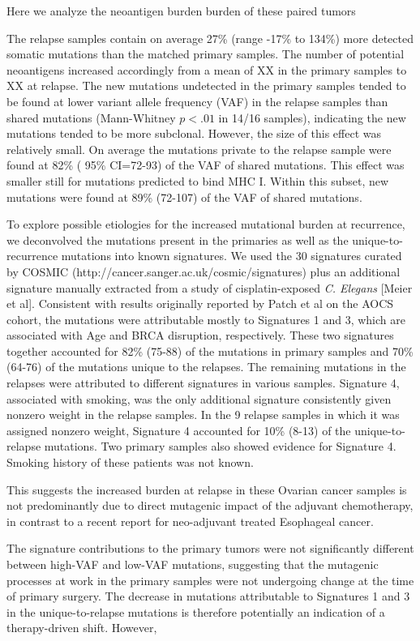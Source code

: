 Here we analyze the neoantigen burden burden of these paired tumors 

The relapse samples contain on average 27\% (range -17\% to 134\%) more detected somatic mutations than the matched primary samples. The number of potential neoantigens increased accordingly from a mean of XX in the primary samples to XX at relapse. The new mutations undetected in the primary samples tended to be found at lower variant allele frequency (VAF) in the relapse samples than shared mutations (Mann-Whitney $p \lt .01$ in 14/16 samples), indicating the new mutations tended to be more subclonal. However, the size of this effect was relatively small. On average the mutations private to the relapse sample were found at 82\% ( 95\% CI=72-93) of the VAF of shared mutations. This effect was smaller still for mutations predicted to bind MHC I. Within this subset, new mutations were found at 89\% (72-107) of the VAF of shared mutations.

To explore possible etiologies for the increased mutational burden at recurrence, we deconvolved the mutations present in the primaries as well as the unique-to-recurrence mutations into known signatures. We used the 30 signatures curated by COSMIC (http://cancer.sanger.ac.uk/cosmic/signatures) plus an additional signature manually extracted from a study of cisplatin-exposed \textit{C. Elegans} [Meier et al]. Consistent with results originally reported by Patch et al on the AOCS cohort, the mutations were attributable mostly to Signatures 1 and 3, which are associated with Age and BRCA disruption, respectively. These two signatures together accounted for 82\% (75-88) of the mutations in primary samples and 70\% (64-76) of the mutations unique to the relapses. The remaining mutations in the relapses were attributed to different signatures in various samples. Signature 4, associated with smoking, was the only additional signature consistently given nonzero weight in the relapse samples. In the 9 relapse samples in which it was assigned nonzero weight, Signature 4 accounted for 10\% (8-13) of the unique-to-relapse mutations. Two primary samples also showed evidence for Signature 4. Smoking history of these patients was not known.

This suggests the increased burden at relapse in these Ovarian cancer samples is not predominantly due to direct mutagenic impact of the adjuvant chemotherapy, in contrast to a recent report for neo-adjuvant treated Esophageal cancer.
 
The signature contributions to the primary tumors were not significantly different between high-VAF and low-VAF mutations, suggesting that the mutagenic processes at work in the primary samples were not undergoing change at the time of primary surgery. The decrease in mutations attributable to Signatures 1 and 3 in the unique-to-relapse mutations is therefore potentially an indication of a therapy-driven shift. However, 

